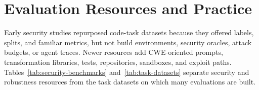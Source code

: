 \documentclass[acmsmall,screen,review]{acmart}
\begin{document}

\section{Evaluation Resources and Practice} \label{sec:eval}

Early security studies repurposed code-task datasets because they offered labels, splits, and familiar metrics, but not build environments, security oracles, attack budgets, or agent traces. Newer resources add CWE-oriented prompts, transformation libraries, tests, repositories, sandboxes, and exploit paths. Tables~\ref{tab:security-benchmarks} and~\ref{tab:task-datasets} separate security and robustness resources from the task datasets on which many evaluations are built.
\end{document}
